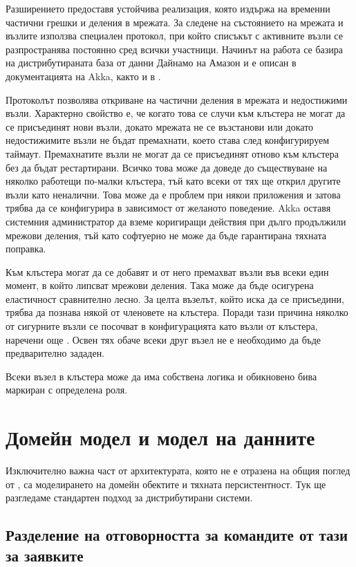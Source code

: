 Разширението предоставя устойчива реализация, която издържа на временни частични грешки и деления в мрежата. За следене на състоянието на мрежата и възлите използва специален  протокол, при който списъкът с активните възли се разпространява постоянно сред всички участници. Начинът на работа се базира на дистрибутираната база от данни Дайнамо на Амазон и е описан в документацията на Akka, както и в \cite{deCandia2007Dynami}.

Протоколът позволява откриване на частични деления в мрежата и недостижими възли. Характерно свойство е, че когато това се случи към клъстера не могат да се присъединят нови възли, докато мрежата не се възстанови или докато недостижимите възли не бъдат премахнати, което става след конфигурируем таймаут. Премахнатите възли не могат да се присъединят отново към клъстера без да бъдат рестартирани. Всичко това може да доведе до съществуване на няколко работещи по-малки клъстера, тъй като всеки от тях ще открил другите възли като неналични. Това може да е проблем при някои приложения и затова трябва да се конфигурира в зависимост от желаното поведение. Akka оставя системния администратор да вземе коригиращи действия при дълго продължили мрежови деления, тъй като софтуерно не може да бъде гарантирана тяхната поправка.

Към клъстера могат да се добавят и от него премахват възли във всеки един момент, в който липсват мрежови деления. Така може да бъде осигурена еластичност сравнително лесно. За целта възелът, който иска да се присъедини, трябва да познава някой от членовете на клъстера. Поради тази причина няколко от сигурните възли се посочват в конфигурацията като възли от клъстера, наречени още . Освен тях обаче всеки друг възел не е необходимо да бъде предварително зададен.

Всеки възел в клъстера може да има собствена логика и обикновено бива маркиран с определена роля.

\section{Домейн модел и модел на данните}

Изключително важна част от архитектурата, която не е отразена на общия поглед от , са моделирането на домейн обектите и тяхната персистентност. Тук ще разгледаме стандартен подход за дистрибутирани системи.

\subsection{Разделение на отговорността за командите от тази за заявките}

